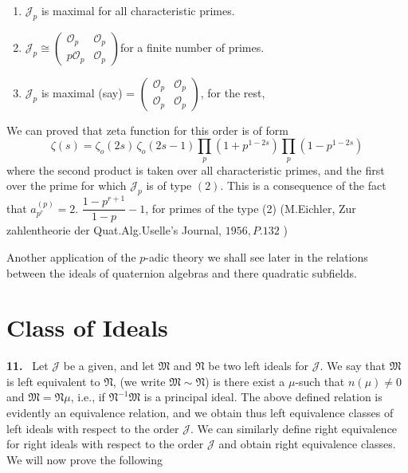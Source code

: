 \begin{enumerate}
\item $\mathcal{J}_p$ is maximal for all characteristic primes.	
\item $\mathcal{J}_p \cong \begin{pmatrix} \mathscr{O}_p & \mathscr{O}_p \\
  p \mathscr{O}_p & \mathscr{O}_p \end{pmatrix}$\pageoriginale for a finite number of primes.
\item $\mathcal{J}_p$ is maximal  (say) = $\begin{pmatrix}
  \mathscr{O}_p & \mathscr{O}_p \\ \mathscr{O}_p &
  \mathscr{O}_p \end{pmatrix}$, for the rest, 
\end{enumerate}

We can proved that zeta function for this order is of form
$$
\zeta (s)= \zeta_o (2s)\, \zeta_o (2 s-1) \prod_p (1+ p^{1-2s})
\prod_p (1-p^{1-2s}) 
$$
where the second product is taken over all characteristic primes, and
the first over the prime for which $\mathcal{J}_p$ is of type
$(2)$. This is a consequence of the fact that $a^{(p)}_{p^r} =
2$. $\dfrac{1-p^{r+1}}{1-p} -1$, for primes of the type (2) (M.Eichler,
Zur zahlentheorie der Quat.Alg.Uselle's Journal, $1956,P.132$ ) 

Another application of the $p$-adic theory we shall see later in the
relations between the ideals of quaternion algebras and there
quadratic subfields. 

\section{Class of Ideals}\label{chap1:sec3} %

\textbf{11.}~ Let $\mathcal{J}$ be a given, and let $\mathfrak{M}$ and
$\mathfrak{N}$ be two left ideals for $\mathcal{J}$. We say that
$\mathfrak{M}$ is left equivalent to $\mathfrak{N}$, (we write
$\mathfrak{M} \sim \mathfrak{N}$) is there exist a $\mu$-such that
$n(\mu) \neq 0$ and $\mathfrak{M}=\mathfrak{N} \mu$, i.e., if
$\mathfrak{N}^{-1} \mathfrak{M}$ is a  principal ideal. The above defined
relation is evidently an equivalence relation, and we obtain thus left
equivalence classes of left ideals with respect  to the order
$\mathcal{J}$. We can similarly define right equivalence for right
ideals with respect to the order $\mathcal{J}$ and obtain right
equivalence classes. We will now prove the following  

